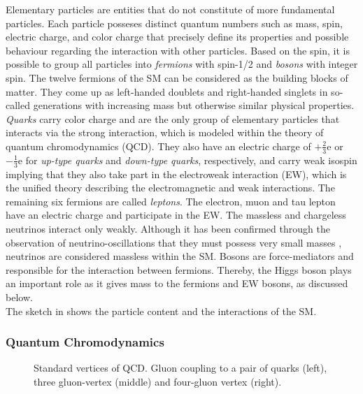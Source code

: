 Elementary particles are entities that do not constitute of more fundamental particles. Each particle posseses distinct quantum numbers such as mass, spin, electric charge, and color charge that precisely define its
properties and possible behaviour regarding the interaction with other particles. 
Based on the spin, it is possible to group all particles into \textit{fermions} with spin-1/2 and \textit{bosons} with integer spin.
The twelve fermions of the SM can be considered as the building blocks of matter. They come up as left-handed doublets and right-handed singlets in so-called generations with increasing mass but otherwise similar physical properties. 
\textit{Quarks} carry color charge and are the only group of elementary particles that interacts via the strong interaction, which is modeled within the theory of quantum chromodynamics (QCD). They also 
have an electric charge of $+\frac{\text{2}}{\text{3}}\text{e}$ or $-\frac{\text{1}}{\text{3}}\text{e}$ for \textit{up-type quarks} and \textit{down-type quarks}, respectively, and carry weak isospin implying that they also take part in the electroweak interaction (EW), which is the unified theory describing the electromagnetic and weak interactions. 
The remaining six fermions are called \textit{leptons}. 
The electron, muon and tau lepton have an electric charge and participate in the EW. The massless and chargeless neutrinos interact only weakly. Although it has been confirmed through the observation of neutrino-oscillations that they must possess very small masses \cite{PhysRevLett.81.1562,Ahmad:2001an,PhysRevLett.89.011301}, neutrinos are considered massless within the SM.
Bosons are force-mediators and responsible for the interaction between fermions. Thereby, the Higgs boson plays an important role as it gives mass to the fermions and EW bosons, as discussed below. \\
The sketch in  shows the particle content and the interactions of the SM.

\subsubsection{Quantum Chromodynamics}\label{subsec:QCD}
\begin{figure}[h!]
    \centering
    
    \caption[Standard vertices of QCD.]{Standard vertices of QCD. Gluon coupling to a pair of quarks (left), three gluon-vertex (middle) and 
    four-gluon vertex (right).}\label{theory:QCD_vertices}
\end{figure}

